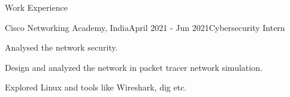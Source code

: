 \documentclass{resume} %
\begin{document}

 



\begin{rSection}{Work Experience}
\begin{rSubsection}{Cisco Networking Academy, India}{April 2021 - Jun 2021}{Cybersecurity Intern}{}
 \item Analysed the network security.
 \item Design and analyzed the network in packet tracer network simulation.
 \item Explored Linux and tools like Wireshark, dig etc.
\end{rSubsection}
\end{rSection}

\end{document}
